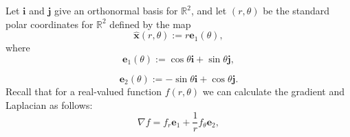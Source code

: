\begin{Example}
\label{ex:nonsmooth-sector-boundary-regularity}
Let $\bm{i}$ and $\bm{j}$ give an orthonormal basis for $\mathbb{R}^2$, and let $(r,\theta)$ be the standard polar coordinates for $\mathbb{R}^2$ defined by the map
\begin{equation}\label{eq:corner-example-polar-coordinate-map}
\widehat{\bm{x}}(r,\theta):=r\bm{e}_1(\theta),
\end{equation}
where
\begin{equation}\label{eq:corner-example-first-polar-basis-vector}
\bm{e}_1(\theta):=\cos\theta\bm{i}+\sin\theta\bm{j},
\end{equation}

\begin{equation}\label{eq:corner-example-second-polar-basis-vector}
\bm{e}_2(\theta):=-\sin\theta\bm{i}+\cos\theta\bm{j}.
\end{equation}
Recall that for a real-valued function $f(r,\theta)$ we can calculate the gradient and Laplacian as follows:
\begin{equation}\label{eq:corner-example-polar-gradient-formula}
\nabla f=f_r\bm{e}_1+\frac{1}{r}f_\theta\bm{e}_2,
\end{equation}


\end{Example}
